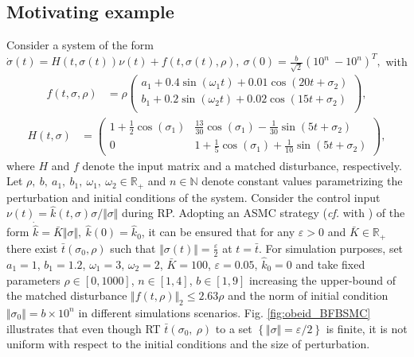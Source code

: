 \documentclass[twocolumn]{autart}    %
\begin{document}
\subsection{Motivating example}\label{subsec:motexmp}\vspace{-5pt}
Consider a system of the form $\dot{\sigma}(t)=H(t,\sigma(t))\nu(t) + f(t,\sigma(t),\rho), \:
\sigma(0)=\tfrac{b}{\sqrt{2}}(
10^{n} \: -10^{n})^T,$ with \vspace{-5pt}
\begin{equation*}
\begin{aligned}
 f(t,\sigma,\rho)&\!\!=\!\!\rho\begin{pmatrix}
a_1 + 0.4  \sin (\omega_1 t)+ 0.01  \cos(20t+\sigma_2)\\
b_1 + 0.2  \sin (\omega_2 t)+ 0.02  \cos(15t+\sigma_2)\\
\end{pmatrix},
\end{aligned}
\end{equation*}
\begin{equation*}
\begin{aligned}
H(t,\sigma)&\!\!=\!\!\begin{pmatrix}
1+\tfrac{1}{2}\cos(\sigma_1) & \tfrac{13}{30}\cos(\sigma_1)-\tfrac{1}{30}\sin(5t+\sigma_2)\\
0 &\!\!\!\!\!\!\! 1+\tfrac{1}{5}\cos(\sigma_1)+\tfrac{1}{10}\sin(5t+\sigma_2)
\end{pmatrix},
\end{aligned}
\end{equation*} where $H$ and $f$ denote the input matrix and a matched disturbance, respectively. Let $\rho, \:b,\:a_1,\:b_1,\: \omega_1,\: \omega_2\in \mathbb{R}_+$ and $n\in \mathbb{N}$ denote constant values parametrizing the perturbation and initial conditions of the system.  Consider the control input $\nu(t)=\hat{k}(t,\sigma)\sigma/\Vert \sigma \Vert$ during RP. Adopting an ASMC strategy (\textit{cf. } with \cite{obeid18,plestan2010}) of the form $\dot{\hat{k}}=\bar{K}\Vert \sigma \Vert,\: \hat{k}(0)=\hat{k}_{0}$, it can be ensured that for any $\varepsilon>0$ and $\bar{K}\in \mathbb{R}_+$ there exist $\bar{t}(\sigma_0,\rho)$ such that $\Vert \sigma(t)\Vert = \frac{\varepsilon}{2}$ at $t=\bar{t}$.  For simulation purposes, set $a_1=1$, $b_1=1.2$, $\omega_1=3$, $\omega_2=2$, $\bar{K}=100$, $\varepsilon=0.05$, $\hat{k}_{0}=0$ and take fixed parameters $\rho \in [0,1000]$, $n\in [1,4]$, $b\in [1,9]$ increasing the  upper-bound of the matched disturbance $\Vert f(t,\rho) \Vert_2 \leq 2.63 \rho$ and the norm of initial condition $\Vert\sigma_0\Vert=b \times 10^n$ in different simulations scenarios.  Fig. \ref{fig:obeid_BFBSMC} illustrates that even though RT $\bar{t}(\sigma_0,\:\rho)$ to a set $\left\lbrace \Vert \sigma \Vert =\varepsilon/2 \right\rbrace$ is finite, it is not uniform with respect to the initial conditions and the size of perturbation.%
\end{document}
